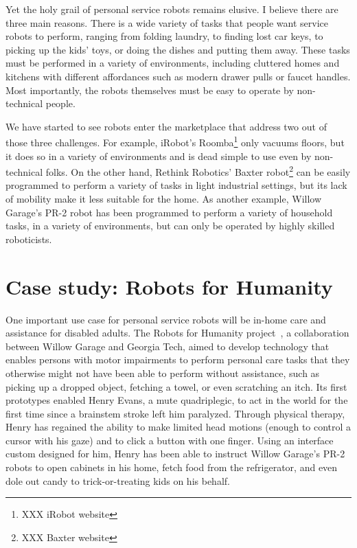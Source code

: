 \documentclass[10pt,twocolumn]{article}
\begin{document}
\begin{changebar}
Yet the holy grail of personal service robots remains elusive. I believe there are three main reasons. There is a wide variety of tasks that people want service robots to perform, ranging from folding laundry, to finding lost car keys, to picking up the kids' toys, or doing the dishes and putting them away. These tasks must be performed in a variety of environments, including cluttered homes and kitchens with different affordances such as modern drawer pulls or faucet handles. Most importantly, the robots themselves must be easy to operate by non-technical people.

We have started to see robots enter the marketplace that address two out of those three challenges. For example, iRobot's Roomba\footnote{XXX iRobot website} only vacuums floors, but it does so in a variety of environments and is dead simple to use even by non-technical folks. On the other hand, Rethink Robotics' Baxter robot\footnote{XXX Baxter website} can be easily programmed to perform a variety of tasks in light industrial settings, but its lack of mobility make it less suitable for the home. As another example, Willow Garage's PR-2 robot has been programmed to perform a variety of household tasks, in a variety of environments, but can only be operated by highly skilled roboticists.
\end{changebar}

\section{Case study: Robots for Humanity}

One important use case for personal service robots will be in-home care and assistance for disabled adults. The Robots for Humanity project~\cite{rfh}, a collaboration between Willow Garage and Georgia Tech, aimed to develop technology that enables persons with motor impairments to perform personal care tasks that they otherwise might not have been able to perform without assistance, such as picking up a dropped object, fetching a towel, or even scratching an itch. Its first prototypes enabled Henry Evans, a mute quadriplegic, to act in the world for the first time since a brainstem stroke left him paralyzed. Through physical therapy, Henry has regained the ability to make limited head motions (enough to control a cursor with his gaze) and to click a button with one finger.  Using an interface custom designed for him, Henry has been able to instruct Willow Garage's PR-2 robots to open cabinets in his home, fetch food from the refrigerator, and even dole out candy to trick-or-treating kids on his behalf.
\end{document}
